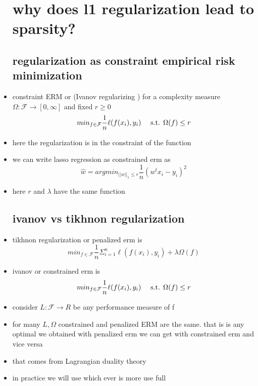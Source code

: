 \documentclass{article}
\begin{document}
\begin{itemize}
\section{why does l1 regularization lead to sparsity?}
\subsection{regularization as constraint empirical risk minimization}
\item constraint ERM or (Ivanov regularizing ) for a complexity measure $\Omega:\mathcal{F}\rightarrow[0,\infty]$ and fixed $r\geq 0$ $$min_{f\in \mathcal{F}}\frac{1}{n}\ell(f(x_i),y_i) \\\quad \text{ s.t. } \Omega(f)\leq r$$
\item here the regularization is in the constraint of the function
\item we can write lasso regression as constrained erm as$$\hat{w}=argmin_{||w||_{1}\leq r}\frac{1}{n}(w^{t}x_i-y_i)^2$$
\item here $r$ and $\lambda$ have the same function 
\subsection{ivanov vs tikhnon regularization}
\item tikhnon regularization or penalized erm is $$min_{f\in \mathcal{F}}\frac{1}{n}\Sigma_{i=1}^{n}\ell(f(x_i),y_i)+\lambda\Omega(f)$$ 
\item ivanov or constrained erm is $$min_{f\in \mathcal{F}}\frac{1}{n}\ell(f(x_i),y_i) \\\quad \text{ s.t. } \Omega(f)\leq r$$
\item consider $L:\mathcal{F}\rightarrow R$ be any performance measure of f 
\item for many $L, \Omega$ constrained and penalized ERM are the same. that is is any optimal we obtained with penalized erm we can get with constrained erm and vice versa
\item that comes from Lagrangian duality theory
\item in practice we will use which ever is more use full 



\end{itemize}
\end{document}
